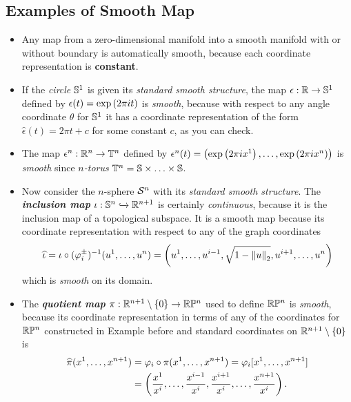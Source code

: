 \documentclass[11pt]{article}
\begin{document}
\subsection{Examples of Smooth Map}
\begin{itemize}
\item \begin{example}
Any map from a zero-dimensional manifold into a smooth manifold with or without boundary is automatically smooth, because each coordinate representation is \textbf{constant}.
\end{example}

\item \begin{example}
If the \emph{circle} ${\mathbb S}^1$ is given its \emph{standard smooth structure}, the map $\epsilon: {\mathbb R} \rightarrow {\mathbb S}^1$ defined by $\epsilon(t) = \exp\left(2\pi i t\right)$ is \emph{smooth}, because with respect to any angle coordinate $\theta$ for ${\mathbb S}^1$ it has a coordinate representation of the form $\widehat{\epsilon}(t) = 2 \pi t + c$ for some constant $c$, as you can check.
\end{example}

\item \begin{example}
The map $\epsilon^n: {\mathbb R}^{n} \rightarrow \mathbb{T}^n$ defined by $\epsilon^n(t) = \left(\exp\left(2\pi i x^1\right), \ldots, \exp\left(2\pi i x^n\right)\right)$ is \emph{smooth} since \emph{$n$-torus} $\mathbb{T}^n = {\mathbb S}\times \ldots \times {\mathbb S}$.
\end{example}

\item \begin{example}
Now consider the $n$-sphere ${\mathcal S}^n$ with its \emph{standard smooth structure}. The \textbf{\emph{inclusion map}} $\iota: {\mathbb S}^n \xhookrightarrow{} {\mathbb R}^{n+1}$ is certainly \emph{continuous}, because it is the inclusion map of a topological subspace. It is a smooth map because its coordinate representation with respect to any of the graph coordinates
\begin{align*}
\widehat{\iota} = \iota \circ (\varphi_{i}^{\pm})^{-1}(u^1, \ldots, u^n) =  \left(u^1, \ldots, u^{i-1}, \sqrt{1 - \left\|u\right\|_{2}}, u^{i+1}, \ldots, u^{n}\right)
\end{align*} which is \emph{smooth} on its domain.
\end{example}

\item \begin{example}
The \emph{\textbf{quotient map}} $\pi: {\mathbb R}^{n+1} \setminus \left\{0\right\} \rightarrow {\mathbb R}{\mathbb P}^n$ used to define ${\mathbb R}{\mathbb P}^n$ is \emph{smooth}, because its coordinate representation in terms of any of the coordinates for ${\mathbb R}{\mathbb P}^n$ constructed in Example before and standard coordinates on ${\mathbb R}^{n+1} \setminus \left\{0\right\}$ is
\begin{align*}
\widehat{\pi}(x^1, \ldots, x^{n+1}) &= \varphi_{i} \circ \pi(x^1, \ldots, x^{n+1}) =\varphi_{i}[x^1, \ldots, x^{n+1}] \\
&= \left(\frac{x^1}{x^{i}}, \ldots, \frac{x^{i-1}}{x^{i}}, \frac{x^{i+1}}{x^{i}},\ldots, \frac{x^{n+1}}{x^{i}}\right).
\end{align*}
\end{example}


\end{itemize}
\end{document}
